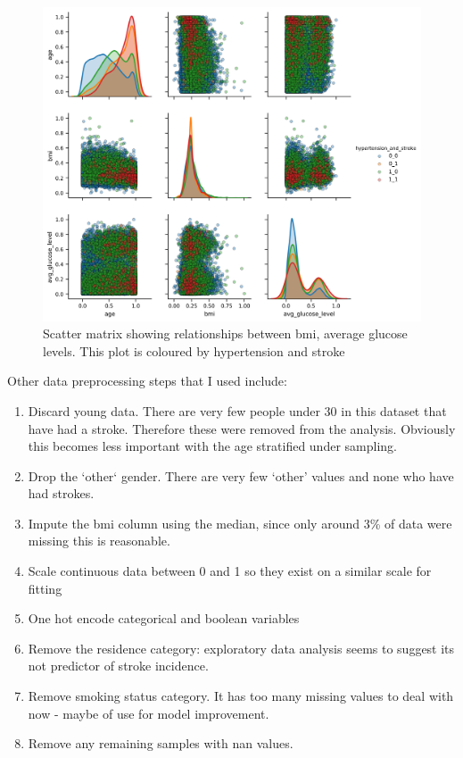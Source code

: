 \documentclass[12pt]{article}
\begin{document}
    \begin{figure}[t]
        \includegraphics[width=\textwidth]{../data/Plots/scatter_matrix/proc_hypertension.png}
        \caption{Scatter matrix showing relationships between bmi, average glucose levels. This plot is coloured by
        hypertension and stroke}
        \label{fig:scatter_matrix}
    \end{figure}

    Other data preprocessing steps that I used include:
    \begin{enumerate}
        \item Discard young data. There are very few people under 30 in this dataset that have had a stroke. Therefore these were removed from the analysis. Obviously this becomes less important with the age stratified under sampling.
        \item Drop the `other` gender. There are very few `other' values and none who have had strokes.
        \item Impute the bmi column using the median, since only around 3\% of data were missing this is reasonable.
        \item Scale continuous data between 0 and 1 so they exist on a similar scale for fitting
        \item One hot encode categorical  and boolean variables
        \item Remove the residence category: exploratory data analysis seems to suggest its not predictor of stroke incidence.
        \item Remove smoking status category. It has too many missing values to deal with now - maybe of use for model improvement.
        \item Remove any remaining samples with nan values.
    \end{enumerate}
\end{document}
